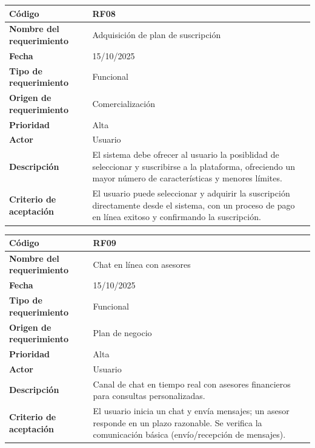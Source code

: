 \begin{table}[H]
	\begin{tabular}{|a{5cm}|m{11cm}|}
		\hline
		\textbf{Código} & RF08 \\ \hline
		\textbf{Nombre del requerimiento} & Adquisición de plan de suscripción \\ \hline
		\textbf{Fecha} & 15/10/2025 \\ \hline
		\textbf{Tipo de requerimiento} & Funcional \\ \hline
		\textbf{Origen de requerimiento} & Comercialización \\ \hline
		\textbf{Prioridad} & Alta \\ \hline
		\textbf{Actor} & Usuario \\ \hline
		\textbf{Descripción} & El sistema debe ofrecer al usuario la posiblidad de seleccionar y suscribirse a la plataforma, ofreciendo un mayor número de características y menores límites. \\ \hline
		\textbf{Criterio de aceptación} & El usuario puede seleccionar y adquirir la suscripción directamente desde el sistema, con un proceso de pago en línea exitoso y confirmando la suscripción. \\ \hline
	\end{tabular}
\end{table}

\begin{table}[H]
	\begin{tabular}{|a{5cm}|m{11cm}|}
		\hline
		\textbf{Código} & RF09 \\ \hline
		\textbf{Nombre del requerimiento} & Chat en línea con asesores \\ \hline
		\textbf{Fecha} & 15/10/2025 \\ \hline
		\textbf{Tipo de requerimiento} & Funcional \\ \hline
		\textbf{Origen de requerimiento} & Plan de negocio \\ \hline
		\textbf{Prioridad} & Alta \\ \hline
		\textbf{Actor} & Usuario \\ \hline
		\textbf{Descripción} & Canal de chat en tiempo real con asesores financieros para consultas personalizadas. \\ \hline
		\textbf{Criterio de aceptación} & El usuario inicia un chat y envía mensajes; un asesor responde en un plazo razonable. Se verifica la comunicación básica (envío/recepción de mensajes). \\ \hline
	\end{tabular}
\end{table}

